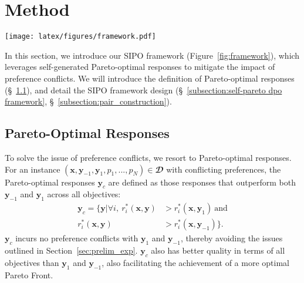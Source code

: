 \section{Method} \label{sec:method}

\begin{figure*}
 \setlength{\abovecaptionskip}{0.05cm}
 \setlength{\belowcaptionskip}{0cm}
    \centering
    \texttt{[image: latex/figures/framework.pdf]}
    \caption{Illustration of our proposed SIPO framework. }
    \label{fig:framework}
\end{figure*}

In this section, we introduce our SIPO framework (\cf Figure~\ref{fig:framework}), which leverages self-generated Pareto-optimal responses to mitigate the impact of preference conflicts. 
We will introduce the definition of Pareto-optimal responses (§~\ref{subsection:pareto-optimal response}), and detail the SIPO framework design (§~\ref{subsection:self-pareto dpo framework}, §~\ref{subsection:pair_construction}).

\subsection{Pareto-Optimal Responses}
\label{subsection:pareto-optimal response}
To solve the issue of preference conflicts, we resort to Pareto-optimal responses. 
For an instance $(\textbf{x}, \textbf{y}_{-1}, \textbf{y}_1, p_1, ..., p_N) \in \mathbfcal{D}$ with conflicting preferences, the Pareto-optimal responses $\textbf{y}_c$ are defined as those responses that outperform both $\textbf{y}_{-1}$ and $\textbf{y}_1$ across all objectives:
\begin{equation}
\begin{split}
    \textbf{y}_c = \{ \textbf{y}|\forall i, \ r^*_i(\textbf{x}, \textbf{y}) &> r^*_i(\textbf{x}, \textbf{y}_1) \ \text{and}\\ r^*_i(\textbf{x}, \textbf{y}) &> r^*_i(\textbf{x}, \textbf{y}_{-1})\}.
\end{split}
\label{eq:definition_pareto_optimal}
\end{equation}
$\textbf{y}_c$ incurs no preference conflicts with $\textbf{y}_1$ and $\textbf{y}_{-1}$, thereby avoiding the issues outlined in Section~\ref{sec:prelim_exp}. 
$\textbf{y}_c$ also has better quality in terms of all objectives than $\textbf{y}_1$ and $\textbf{y}_{-1}$, also facilitating the achievement of a more optimal Pareto Front.


